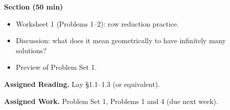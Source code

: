 \documentclass{amsart}
\begin{document}
\bigskip

\textbf{Section (50 min)}
\begin{itemize}
    \item Worksheet 1 (Problems 1--2): row reduction practice.
    \item Discussion: what does it mean geometrically to have infinitely many solutions?
    \item Preview of Problem Set 1.
\end{itemize}

\bigskip

\textbf{Assigned Reading.} Lay \S1.1--1.3 (or equivalent).

\textbf{Assigned Work.} Problem Set 1, Problems 1 and 4 (due next week).
\end{document}
